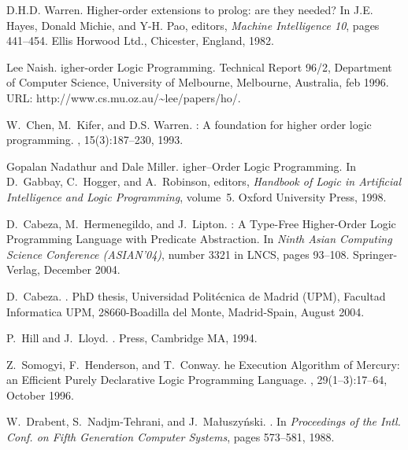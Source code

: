 \documentclass{llncs}
\begin{document}

\begin{thebibliography}{10}

D.H.D. Warren.
\newblock Higher-order extensions to prolog: are they needed?
\newblock In J.E. Hayes, Donald Michie, and Y-H. Pao, editors, {\em Machine
  Intelligence 10}, pages 441--454. Ellis Horwood Ltd., Chicester, England,
  1982.

Lee Naish.
igher-order {L}ogic {P}rogramming.
\newblock Technical Report 96/2, Department of Computer Science, University of
  Melbourne, Melbourne, Australia, feb 1996.
\newblock URL: http://www.cs.mu.oz.au/\~{}lee/papers/ho/.

W.~Chen, M.~Kifer, and D.S. Warren.
: {A} foundation for higher order logic programming.
, 15(3):187--230, 1993.

Gopalan Nadathur and Dale Miller.
igher--{O}rder {L}ogic {P}rogramming.
\newblock In D.~Gabbay, C.~Hogger, and A.~Robinson, editors, {\em {H}andbook of
  {L}ogic in {A}rtificial {I}ntelligence and {L}ogic {P}rogramming}, volume~5.
  Oxford University Press, 1998.

D.~Cabeza, M.~Hermenegildo, and J.~Lipton.
: {A} {T}ype-{F}ree {H}igher-{O}rder {L}ogic {P}rogramming
  {L}anguage with {P}redicate {A}bstraction.
\newblock In {\em Ninth Asian Computing Science Conference (ASIAN'04)}, number
  3321 in LNCS, pages 93--108. Springer-Verlag, December 2004.

D.~Cabeza.
.
\newblock PhD thesis, Universidad Polit\'{e}cnica de Madrid (UPM), Facultad
  Informatica UPM, 28660-Boadilla del Monte, Madrid-Spain, August 2004.

P.~Hill and J.~Lloyd.
.
 Press, Cambridge MA, 1994.

Z.~Somogyi, F.~Henderson, and T.~Conway.
he {E}xecution {A}lgorithm of {M}ercury: an {E}fficient {P}urely
  {D}eclarative {L}ogic {P}rogramming {L}anguage.
, 29(1--3):17--64, October 1996.

W.~Drabent, S.~Nadjm-Tehrani, and J.~Ma{\l}uszy\'{n}ski.
.
\newblock In {\em Proceedings of the Intl. Conf. on Fifth Generation Computer
  Systems}, pages 573--581, 1988.


\end{thebibliography}
\end{document}
